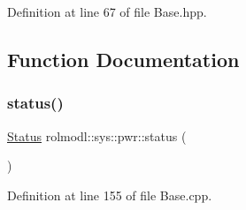 Definition at line 67 of file Base.\+hpp.



\subsection{Function Documentation}
\mbox{\label{namespacerolmodl_1_1sys_1_1pwr_a5ba7d55c19eebf0f8c3deb904d814249}} 
\subsubsection{\texorpdfstring{status()}{status()}}
{\footnotesize\ttfamily \mbox{\hyperlink{structrolmodl_1_1sys_1_1pwr_1_1_status}{Status}} rolmodl\+::sys\+::pwr\+::status (\begin{DoxyParamCaption}{ }\end{DoxyParamCaption})\hspace{0.3cm}{\ttfamily [noexcept]}}



Definition at line 155 of file Base.\+cpp.

